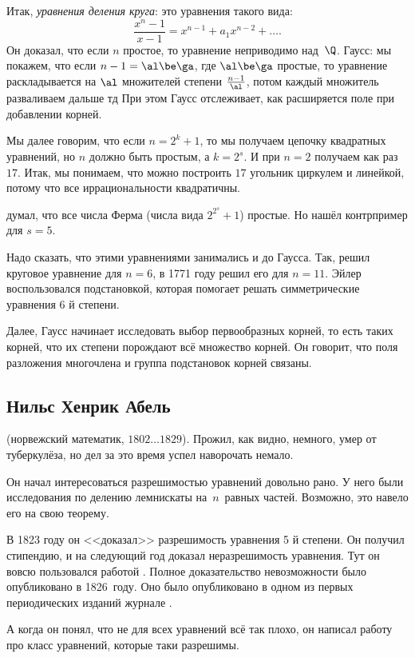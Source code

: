 \documentclass[a4paper,oneside,fleqn,10pt]{article}
\newcommand{\pe}[2]{${#1}\ldots{#2}$}
\begin{document}
Итак, \emph{уравнения деления круга}: это уравнения такого вида:
$$\frac{x^n-1}{x-1} = x^{n-1} + a_1 x^{n-2} + \dots.$$
Он доказал, что если $n$ простое, то уравнение неприводимо над~$\Q$.
Гаусс: мы покажем, что если $n-1 = \al\be\ga$, где $\al\be\ga$ простые, то
уравнение раскладывается на $\al$ множителей степени $\frac{n-1}{\al}$, потом
каждый множитель разваливаем дальше тд При этом Гаусс отслеживает, как расширяется
поле при добавлении корней.

Мы далее говорим, что если $n=2^k+1$, то мы получаем цепочку квадратных уравнений,
но $n$ должно быть простым, а $k = 2^s$.
И при $n=2$ получаем как раз $17$. Итак, мы понимаем, что можно построить $17$ угольник
циркулем и линейкой, потому что все иррациональности квадратичны.

 думал, что все числа Ферма (числа вида $2^{2^s} + 1$) простые. Но  нашёл
контрпример для $s=5$.

Надо сказать, что этими уравнениями занимались и до Гаусса.
Так,  решил круговое уравнение для $n=6$, в 1771 году  решил его для $n=11$.
Эйлер воспользовался подстановкой, которая помогает решать симметрические уравнения 6 й степени.

Далее, Гаусс начинает исследовать выбор первообразных корней, то есть таких
корней, что их степени порождают всё множество корней.
Он говорит, что поля разложения многочлена и группа подстановок корней связаны.

\subsection{Нильс Хенрик Абель}

 (норвежский математик, \pe{1802}{1829}).
Прожил, как видно, немного, умер от туберкулёза, но дел за это время успел наворочать немало.

Он начал интересоваться разрешимостью уравнений довольно рано.
У него были исследования по делению лемнискаты на~$n$~равных частей.
Возможно, это навело его на свою теорему.

В 1823 году он <<доказал>> разрешимость уравнения 5 й степени. Он получил стипендию,
и на следующий год доказал неразрешимость уравнения. Тут он вовсю пользовался работой
. Полное доказательство невозможности было опубликовано в 1826~году.
Оно было опубликовано в одном из первых периодических изданий журнале .

А когда он понял, что не для всех уравнений всё так плохо, он написал работу про класс
уравнений, которые таки разрешимы.
\end{document}
